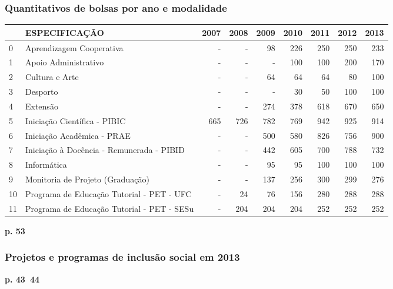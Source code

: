\documentclass{article}
\begin{document}
\subsubsection*{Quantitativos de bolsas por ano e modalidade}
\begin{tabular}{llrrrrrrr}
\toprule
{} &                               ESPECIFICAÇÃO &  2007 &  2008 &  2009 &  2010 &  2011 &  2012 &  2013 \\
\midrule
0  &                    Aprendizagem Cooperativa &     - &     - &    98 &   226 &   250 &   250 &   233 \\
1  &                        Apoio Administrativo &     - &     - &     - &   100 &   100 &   200 &   170 \\
2  &                              Cultura e Arte &     - &     - &    64 &    64 &    64 &    80 &   100 \\
3  &                                    Desporto &     - &     - &     - &    30 &    50 &   100 &   100 \\
4  &                                    Extensão &     - &     - &   274 &   378 &   618 &   670 &   650 \\
5  &                Iniciação Científica - PIBIC &   665 &   726 &   782 &   769 &   942 &   925 &   914 \\
6  &                  Iniciação Acadêmica - PRAE &     - &     - &   500 &   580 &   826 &   756 &   900 \\
7  &   Iniciação à Docência - Remunerada - PIBID &     - &     - &   442 &   605 &   700 &   788 &   732 \\
8  &                                 Informática &     - &     - &    95 &    95 &   100 &   100 &   100 \\
9  &            Monitoria de Projeto (Graduação) &     - &     - &   137 &   256 &   300 &   299 &   276 \\
10 &   Programa de Educação Tutorial - PET - UFC &     - &    24 &    76 &   156 &   280 &   288 &   288 \\
11 &  Programa de Educação Tutorial - PET - SESu &     - &   204 &   204 &   204 &   252 &   252 &   252 \\
\bottomrule
\end{tabular}

\textbf{p. 53}

\subsubsection*{Projetos e programas de inclusão social em 2013}
\textbf{p. 43~44}
\end{document}
